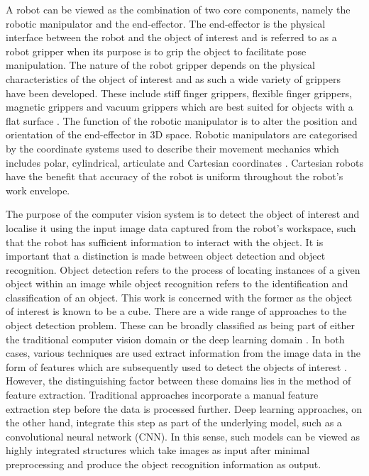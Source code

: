 
A robot can be viewed as the combination of two core components, namely the robotic manipulator and the end-effector. The end-effector is the physical interface between the robot and the object of interest and is referred to as a robot gripper when its purpose is to grip the object to facilitate pose manipulation. The nature of the robot gripper depends on the physical characteristics of the object of interest and as such a wide variety of grippers have been developed. These include stiff finger grippers, flexible finger grippers, magnetic grippers and vacuum grippers which are best suited for objects with a flat surface \cite{Lundstrom:Industrial_Robot_Grippers}. The function of the robotic manipulator is to alter the position and orientation of the end-effector in 3D space. Robotic manipulators are categorised by the coordinate systems used to describe their movement mechanics which includes polar, cylindrical, articulate and Cartesian coordinates \cite{Miller:Robots_and_Robotics_Principles}. Cartesian robots have the benefit that accuracy of the robot is uniform throughout the robot's work envelope.






The purpose of the computer vision system is to detect the object of interest and localise it using the input image data captured from the robot's workspace, such that the robot has sufficient information to interact with the object. It is important that a distinction is made between object detection and object recognition. Object detection refers to the process of locating instances of a given object within an image while object recognition refers to the identification and classification of an object. This work is concerned with the former as the object of interest is known to be a cube. There are a wide range of approaches to the object detection problem. These can be broadly classified as being part of either the traditional computer vision domain or the deep learning domain \cite{MathWorks:Object_Recognition}. In both cases, various techniques are used extract information from the image data in the form of features which are subsequently used to detect the objects of interest \cite{Kumar:Visual_Servoing}. However, the distinguishing factor between these domains lies in the method of feature extraction. Traditional approaches incorporate a manual feature extraction step before the data is processed further. Deep learning approaches, on the other hand, integrate this step as part of the underlying model, such as a convolutional neural network (CNN). In this sense, such models can be viewed as highly integrated structures which take images as input after minimal preprocessing and produce the object recognition information as output.

